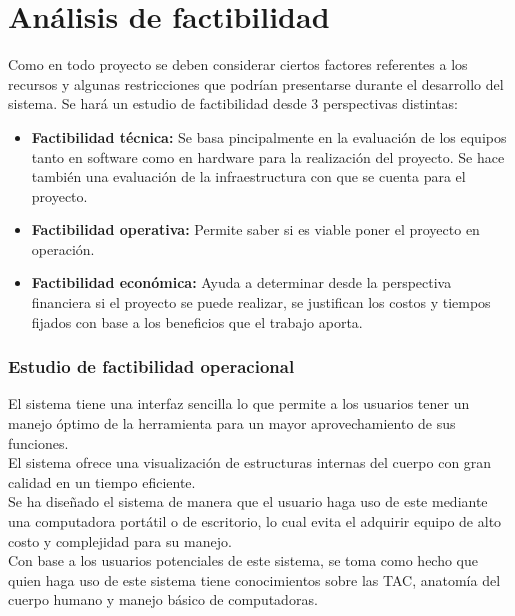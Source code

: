 \documentclass[12pt]{report}
\begin{document}
\section{Análisis de factibilidad}
Como en todo proyecto se deben considerar ciertos factores referentes a los recursos y algunas restricciones que podrían presentarse durante el desarrollo del sistema. Se hará un estudio de factibilidad desde 3 perspectivas distintas:
\begin{itemize}
\item \textbf{Factibilidad técnica: }Se basa pincipalmente en la evaluación de los equipos tanto en software como en hardware para la realización del proyecto. Se hace también una evaluación de la infraestructura con que se cuenta para el proyecto.
\item \textbf{Factibilidad operativa: }Permite saber si es viable poner el proyecto en operación.
\item \textbf{Factibilidad económica: }Ayuda a determinar desde la perspectiva financiera si el proyecto se puede realizar, se justifican los costos y tiempos fijados con base a los beneficios que el trabajo aporta.
\end{itemize}

\subsubsection{Estudio de factibilidad operacional}
El sistema tiene una interfaz sencilla lo que permite a los usuarios tener un manejo óptimo de la herramienta para un mayor aprovechamiento de sus funciones.\\
El sistema ofrece una visualización de estructuras internas del cuerpo con gran calidad en un tiempo eficiente.\\
Se ha diseñado el sistema de manera que el usuario haga uso de este mediante una computadora portátil o de escritorio, lo cual evita el adquirir equipo de alto costo y complejidad para su manejo.\\
Con base a los usuarios potenciales de este sistema, se toma como hecho que quien haga uso de este sistema tiene conocimientos sobre las TAC, anatomía del cuerpo humano y manejo básico de computadoras.\\
\end{document}
